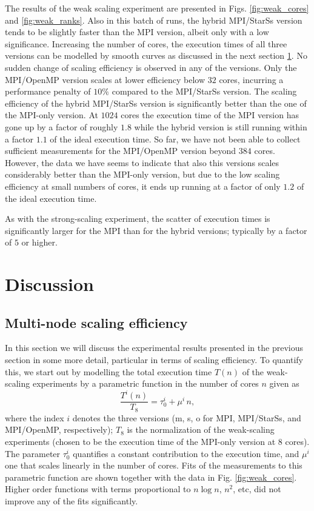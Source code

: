 \documentclass[conference]{IEEEtran}
\newcommand{\starss}{{StarSs}}
\begin{document}
The results of the weak scaling experiment are presented in Figs.
\ref{fig:weak_cores} and \ref{fig:weak_ranks}.  Also in this batch of
runs, the hybrid MPI/\starss{} version tends to be slightly faster than
the MPI version, albeit only with a low significance. Increasing the
number of cores, the execution times of all three versions
can be modelled by smooth curves as discussed in the next section
\ref{sec:discuss}. No sudden change of scaling efficiency is observed
in any of the versions. Only the MPI/OpenMP version scales at
lower efficiency below $32$ cores, incurring a performance penalty of
$10\%$ compared to the MPI/\starss{} version. The scaling
efficiency of the hybrid MPI/\starss{} version is
significantly better than the one of the MPI-only version. At $1024$
cores the execution time of the MPI version has gone up by a factor of roughly
$1.8$ while the hybrid version is still running within a factor $1.1$
of the ideal execution time. So far, we have not been able to collect
sufficient measurements for the MPI/OpenMP version beyond $384$
cores. However, the data we have seems to indicate that also this
versions scales considerably better than the MPI-only version, but
due to the low scaling efficiency at small numbers of cores, it ends up
running at a factor of only $1.2$ of the ideal execution time.

As with the strong-scaling experiment, the scatter of execution times is
significantly larger for the MPI than for the hybrid versions; typically by a
factor of $5$ or higher.

\section{Discussion}
\label{sec:discuss}

\subsection{Multi-node scaling efficiency}
\label{sec:discuss_multi}
In this section we will discuss the experimental results presented in the
previous section in some more detail, particular in terms of scaling
efficiency. To quantify this, we start out by modelling the total execution
time $T(n)$ of the weak-scaling experiments by a parametric function in the
number of cores $n$ given as 
\begin{equation}
\label{eq:tweak}
  \frac{T^i(n)}{T_8} = \tau^i_0 + \mu^i \, n,
\end{equation}
where the index $i$ denotes the three versions (m, s, o for
MPI, MPI/\starss{}, and MPI/OpenMP, respectively); $T_8$ is the
normalization of the weak-scaling experiments (chosen to be the
execution time of the MPI-only version at 8 cores). The parameter
$\tau^i_0$ quantifies a constant contribution to the execution time, and
$\mu^i$ one that scales linearly in the number of cores. Fits of
the measurements to this parametric function are shown together with
the data in Fig. \ref{fig:weak_cores}.
Higher order functions with terms proportional to
$n\log n$, $n^2$, etc, did not improve any of the fits
significantly.
\end{document}
